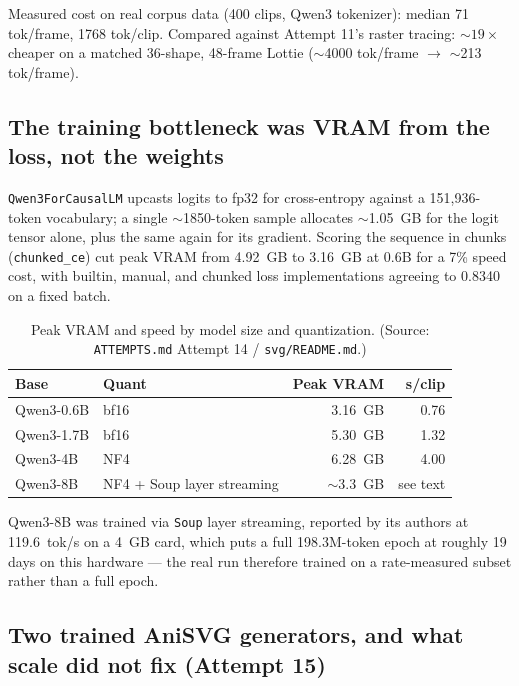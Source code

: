 \documentclass[11pt]{article}
\begin{document}
Measured cost on real corpus data (400 clips, Qwen3 tokenizer): median 71
tok/frame, 1768 tok/clip. Compared against Attempt 11's raster tracing:
$\sim19\times$ cheaper on a matched 36-shape, 48-frame Lottie ($\sim$4000
tok/frame $\rightarrow$ $\sim$213 tok/frame).

\subsection{The training bottleneck was VRAM from the loss, not the weights}
\label{sec:vrambottleneck}

\texttt{Qwen3ForCausalLM} upcasts logits to fp32 for cross-entropy against
a 151{,}936-token vocabulary; a single $\sim$1850-token sample allocates
$\sim$1.05~GB for the logit tensor alone, plus the same again for its
gradient. Scoring the sequence in chunks (\texttt{chunked\_ce}) cut peak
VRAM from 4.92~GB to 3.16~GB at 0.6B for a 7\% speed cost, with builtin,
manual, and chunked loss implementations agreeing to 0.8340 on a fixed
batch.

\begin{table}[h]
\centering
\caption{Peak VRAM and speed by model size and quantization.
(Source: \texttt{ATTEMPTS.md} Attempt 14 / \texttt{svg/README.md}.)}
\label{tab:vram-quant}
\begin{tabular}{@{}llrr@{}}
\toprule
Base & Quant & Peak VRAM & s/clip \\
\midrule
Qwen3-0.6B & bf16 & 3.16~GB & 0.76 \\
Qwen3-1.7B & bf16 & 5.30~GB & 1.32 \\
Qwen3-4B & NF4 & 6.28~GB & 4.00 \\
Qwen3-8B & NF4 + Soup layer streaming & $\sim$3.3~GB & see text \\
\bottomrule
\end{tabular}
\end{table}

Qwen3-8B was trained via \texttt{Soup} layer streaming, reported by its
authors at 119.6~tok/s on a 4~GB card, which puts a full 198.3M-token
epoch at roughly 19 days on this hardware --- the real run therefore
trained on a rate-measured subset rather than a full epoch.

\subsection{Two trained AniSVG generators, and what scale did not fix (Attempt 15)}
\label{sec:twogenerators}
\end{document}
